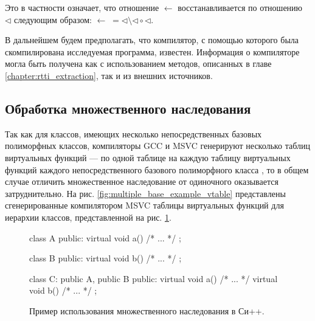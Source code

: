 Это в частности означает, что отношение $\leftarrow$ восстанавливается по отношению $\lhd$ следующим образом: $\leftarrow \; = \lhd \setminus \lhd \circ \lhd$.

В дальнейшем будем предполагать, что компилятор, с помощью которого была скомпилирована исследуемая программа, известен. Информация о компиляторе могла быть получена как с использованием методов, описанных в главе \ref{chapter:rtti_extraction}, так и из внешних источников.




\subsection{Обработка множественного наследования}\label{chapter:multiple_inheritance}
Так как для классов, имеющих несколько непосредственных базовых полиморфных классов, компиляторы GCC и MSVC генерируют несколько таблиц виртуальных функций --- по одной таблице на каждую таблицу виртуальных функций каждого непосредственного базового полиморфного класса \cite{gray94, gccabi}, то в общем случае отличить множественное наследование от одиночного оказывается затруднительно. На рис. \ref{fig:multiple_base_example_vtable} представлены сгенерированные компилятором MSVC таблицы виртуальных функций для иерархии классов, представленной на рис. \ref{listing:multiple_base_example}.

\begin{figure}[htb!]
\hspace{2cm}
\begin{minipage}[b]{1cm}
\begin{cplusplus}
class A {
public:
    virtual void a() {/* ... */}
};

class B {
public:
    virtual void b() {/* ... */}
};

class C: public A, public B {
public:
    virtual void a() {/* ... */}
    virtual void b() {/* ... */}
};
\end{cplusplus}
\end{minipage}
\caption{Пример использования множественного наследования в Си++.}
\label{listing:multiple_base_example}
\end{figure}

